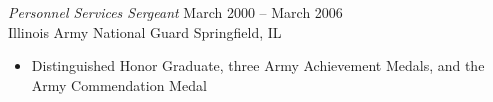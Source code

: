 \documentclass[margin,line]{resume}
\begin{document}
\begin{resume}
{\sl Personnel Services Sergeant}  \hfill   March 2000 -- March 2006\\
Illinois Army National Guard  \hfill   Springfield, IL
\begin{itemize} \itemsep -2pt %
\small\item Distinguished Honor Graduate, three Army Achievement Medals, and the Army Commendation Medal
\end{itemize}


\end{resume}
\end{document}
